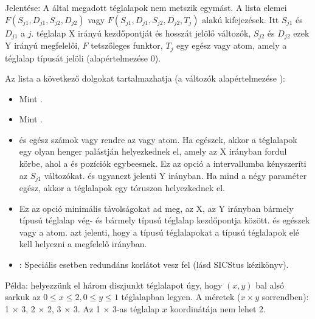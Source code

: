 {}

     Jelentése: A  által megadott téglalapok nem metszik
     egymást. A  lista elemei $F(S_{j1},D_{j1},S_{j2},D_{j2})$
     vagy $F(S_{j1},D_{j1},S_{j2},D_{j2},T_j)$ alakú kifejezések. Itt
     $S_{j1}$ és $D_{j1}$ a $j$. téglalap X irányú kezdőpontját és hosszát
     jelölő változók, $S_{j2}$ és $D_{j2}$ ezek Y irányú megfelelői,
     $F$ tetszőleges funktor,  $T_j$ egy egész vagy atom, amely a
     téglalap típusát jelöli (alapértelmezése 0).

Az  lista a következő dolgokat tartalmazhatja (a  változók
alapértelmezése ):

\begin{itemize}
\item {}
          Mint .

\item {}
          Mint .

\item {}
           és  egész számok vagy rendre az  vagy
           atom. Ha egészek, akkor a téglalapok egy olyan henger
          palástján helyezkednek el, amely az X irányban fordul körbe, ahol
          a  és  pozíciók egybeesnek. Ez az opció a
           intervallumba kényszeríti az $S_{j1}$ változókat.
           és  ugyanezt jelenti Y irányban. Ha mind a négy
          paraméter egész, akkor a téglalapok egy tóruszon helyezkednek el.

\item {}
          Ez az opció minimális távolságokat ad meg,  az X,
           az Y irányban bármely  típusú téglalap vég- és bármely 
          típusú téglalap kezdőpontja között.  és  egészek vagy a
           atom.  azt jelenti, hogy a  típusú téglalapokat
          a  típusú téglalapok elé kell helyezni a megfelelő irányban.

\item {}:  Speciális esetben redundáns korlátot
          vesz fel (lásd SICStus kézikönyv).
\end{itemize}

Példa: helyezzünk el három diszjunkt téglalapot úgy, hogy $(x,y)$ bal alsó sarkuk
az $0 \leq x \leq 2, 0 \leq y \leq 1$ téglalapban legyen. A méretek ($x \times y$
sorrendben): 1 $\times$ 3, 2 $\times$ 2, 3 $\times$ 3. Az 1 $\times$ 3-as téglalap
$x$ koordinátája nem lehet 2.

